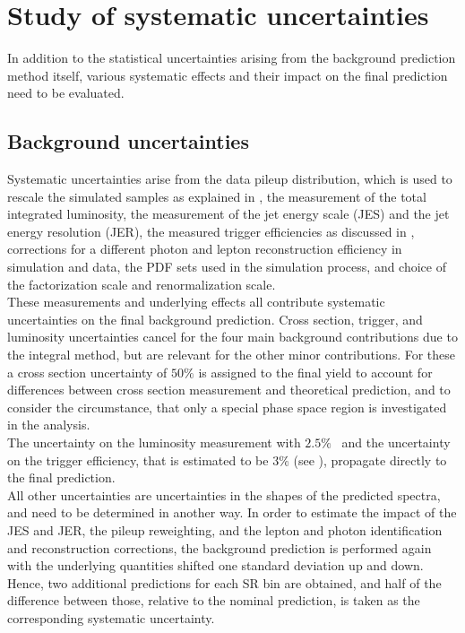 \section{Study of systematic uncertainties}\label{sec:Syst}
In addition to the statistical uncertainties arising from the background prediction method itself, various systematic effects and their impact on the final prediction need to be evaluated.

\subsection{Background uncertainties}
Systematic uncertainties arise from the data pileup distribution, which is used to rescale the simulated samples as explained in , the measurement of the total integrated luminosity, the measurement of the jet energy scale (JES) and the jet energy resolution (JER), the measured trigger efficiencies as discussed in , corrections for a different photon and lepton reconstruction efficiency in simulation and data, the PDF sets used in the simulation process, and choice of the factorization scale and renormalization scale.\\
These measurements and underlying effects all contribute systematic uncertainties on the final background prediction. Cross section, trigger, and luminosity uncertainties cancel for the four main background contributions due to the integral method, but are relevant for the other minor contributions. For these a cross section uncertainty of $50\%$ is assigned to the final yield to account for differences between cross section measurement and theoretical prediction, and to consider the circumstance, that only a special phase space region is investigated in the analysis.\\
The uncertainty on the luminosity measurement with $2.5\%$~\cite{LumiUncert} and the uncertainty on the trigger efficiency, that is estimated to be $3\%$ (see ), propagate directly to the final prediction.\\
All other uncertainties are uncertainties in the shapes of the predicted spectra, and need to be determined in another way. In order to estimate the impact of the JES and JER, the pileup reweighting, and the lepton and photon identification and reconstruction corrections, the background prediction is performed again with the underlying quantities shifted one standard deviation up and down. Hence, two additional predictions for each SR bin are obtained, and half of the difference between those, relative to the nominal prediction, is taken as the corresponding systematic uncertainty.\\
